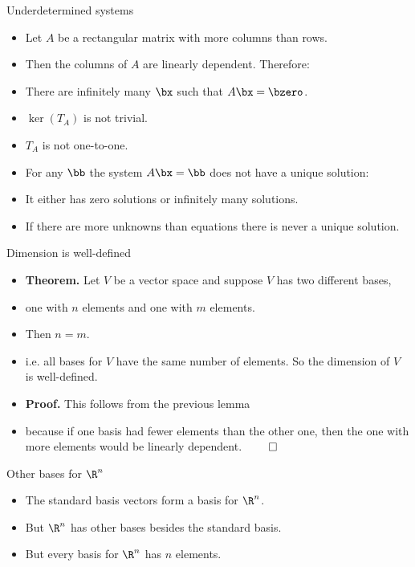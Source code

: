 \documentclass{beamer}
\begin{document}
\begin{frame}{Underdetermined systems}

\begin{itemize}
\item Let $A$ be a rectangular matrix with more columns than rows.
\item Then the columns of $A$ are linearly dependent. Therefore:
\item There are infinitely many $\bx$ such that $A\bx=\bzero$.
\item $\ker(T_A)$ is not trivial.
\item $T_A$ is not one-to-one.
\item For any $\bb$ the system $A\bx=\bb$ does not have a unique solution:
\item It either has zero solutions or infinitely many solutions.
\item If there are more unknowns than equations there is never a unique solution.
\end{itemize}

\end{frame}
\begin{frame}{Dimension is well-defined}

\begin{itemize}
\item \textbf{Theorem.} Let $V$ be a vector space and suppose $V$ has two different bases,
\item one with $n$ elements and one with $m$ elements.
\item Then $n=m$.
\item i.e. all bases for $V$ have the same number of elements. So the dimension of $V$ is well-defined.
\item \textbf{Proof.} This follows from the previous lemma
\item because if one basis had fewer
elements than the other one, then the one with more elements would be linearly dependent. $\qed$
\end{itemize}

\end{frame}

\begin{frame}{Other bases for $\R^n$}

\begin{itemize}
\item The standard basis vectors form a basis for $\R^n$.
\item But $\R^n$ has other bases besides the standard basis.
\item But every basis for $\R^n$ has $n$ elements.
\end{itemize}

\end{frame}
\end{document}
